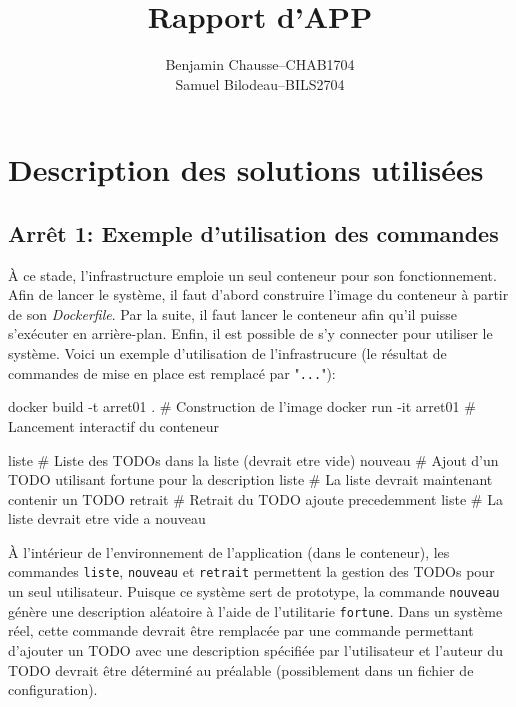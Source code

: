 \documentclass[a11paper, 11pt]{article}
\title{Rapport d'APP}
\author{
  \addtolength{\tabcolsep}{-0.4em}
  \begin{tabular}{rcl} %
  Benjamin Chausse & -- & CHAB1704 \\
  Samuel Bilodeau  & -- & BILS2704 \\
  \end{tabular}
}
\begin{document}
\maketitle
\newpage
\tableofcontents
\newpage

\section{Description des solutions utilisées}

\subsection{Arrêt 1: Exemple d'utilisation des commandes}

À ce stade, l'infrastructure emploie un seul conteneur pour son fonctionnement.
Afin de lancer le système, il faut d'abord construire l'image du conteneur à
partir de son \textit{Dockerfile}. Par la suite, il faut lancer le conteneur
afin qu'il puisse s'exécuter en arrière-plan. Enfin, il est possible de s'y
connecter pour utiliser le système. Voici un exemple d'utilisation de
l'infrastrucure (le résultat de commandes de mise en place est remplacé par
"\texttt{...}"):

\begin{code}[title={zsh (dans un terminal)},listing options={language=bash, style=bashstyle}]
docker build -t arret01 . # Construction de l'image
docker run -it arret01 # Lancement interactif du conteneur
\end{code}

\begin{code}[title={sh (dans le conteneur)},listing options={language=bash, style=bashstyle}]
liste   # Liste des TODOs dans la liste (devrait etre vide)
nouveau # Ajout d'un TODO utilisant fortune pour la description
liste   # La liste devrait maintenant contenir un TODO
retrait # Retrait du TODO ajoute precedemment
liste   # La liste devrait etre vide a nouveau
\end{code}

À l'intérieur de l'environnement de l'application (dans le conteneur), les
commandes \texttt{liste}, \texttt{nouveau} et \texttt{retrait} permettent la
gestion des TODOs pour un seul utilisateur. Puisque ce système sert de
prototype, la commande \texttt{nouveau} génère une description aléatoire à
l'aide de l'utilitarie \texttt{fortune}. Dans un système réel, cette commande
devrait être remplacée par une commande permettant d'ajouter un TODO avec une
description spécifiée par l'utilisateur et l'auteur du TODO devrait être
déterminé au préalable (possiblement dans un fichier de configuration).
\end{document}
